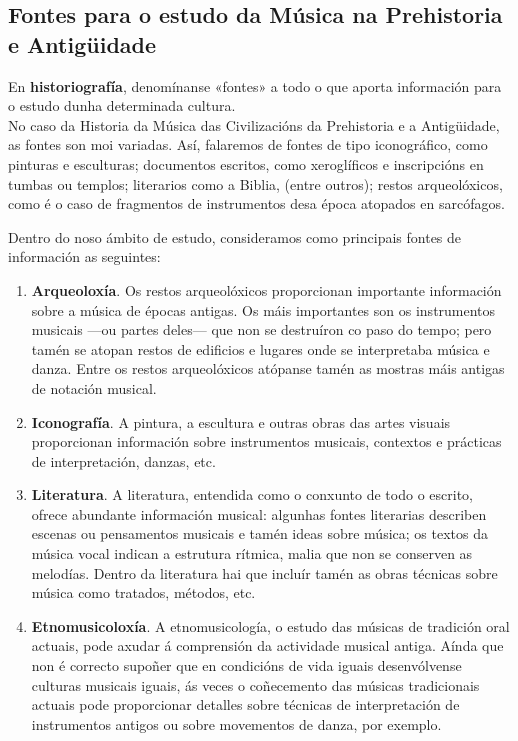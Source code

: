 \documentclass[a4paper, twoside]{templates/ociamthesis}
\providecommand{\tightlist}{%
  \setlength{\itemsep}{0pt}\setlength{\parskip}{0pt}}
\theoremstyle{definition}
\theoremstyle{definition}
\theoremstyle{definition}
\theoremstyle{definition}
\theoremstyle{remark}
\begin{document}
\hypertarget{fontes-para-o-estudo-da-muxfasica-na-prehistoria-e-antiguxfcidade}{%
\subsection*{Fontes para o estudo da Música na Prehistoria e Antigüidade}\label{fontes-para-o-estudo-da-muxfasica-na-prehistoria-e-antiguxfcidade}}

En \textbf{historiografía}, denomínanse «fontes» a todo o que aporta información para o estudo dunha determinada cultura.\\
No caso da Historia da Música das Civilizacións da Prehistoria e a Antigüidade, as fontes son moi variadas. Así, falaremos de fontes de tipo iconográfico, como pinturas e esculturas; documentos escritos, como xeroglíficos e inscripcións en tumbas ou templos; literarios como a Biblia, (entre outros); restos arqueolóxicos, como é o caso de fragmentos de instrumentos desa época atopados en sarcófagos.

Dentro do noso ámbito de estudo, consideramos como principais fontes de información as seguintes:

\begin{enumerate}
\def\labelenumi{\arabic{enumi}.}
\tightlist
\item
  \textbf{Arqueoloxía}. Os restos arqueolóxicos proporcionan importante información sobre a música de épocas antigas. Os máis importantes son os instrumentos musicais ---ou partes deles--- que non se destruíron co paso do tempo; pero tamén se atopan restos de edificios e lugares onde se interpretaba música e danza. Entre os restos arqueolóxicos atópanse tamén as mostras máis antigas de notación musical.
\item
  \textbf{Iconografía}. A pintura, a escultura e outras obras das artes visuais proporcionan información sobre instrumentos musicais, contextos e prácticas de interpretación, danzas, etc.
\item
  \textbf{Literatura}. A literatura, entendida como o conxunto de todo o escrito, ofrece abundante información musical: algunhas fontes literarias describen escenas ou pensamentos musicais e tamén ideas sobre música; os textos da música vocal indican a estrutura rítmica, malia que non se conserven as melodías. Dentro da literatura hai que incluír tamén as obras técnicas sobre música como tratados, métodos, etc.
\item
  \textbf{Etnomusicoloxía}. A etnomusicología, o estudo das músicas de tradición oral actuais, pode axudar á comprensión da actividade musical antiga. Aínda que non é correcto supoñer que en condicións de vida iguais desenvólvense culturas musicais iguais, ás veces o coñecemento das músicas tradicionais actuais pode proporcionar detalles sobre técnicas de interpretación de instrumentos antigos ou sobre movementos de danza, por exemplo.
\end{enumerate}
\end{document}
